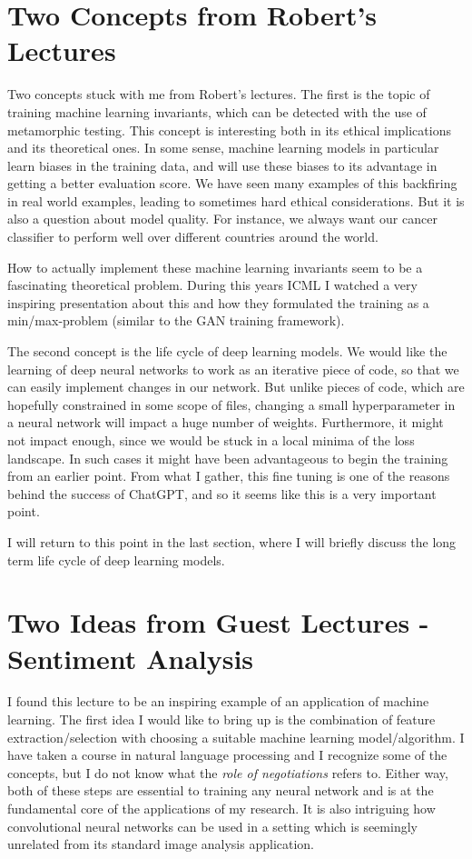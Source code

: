 \documentclass[11pt]{article}
\begin{document}
\section*{Two Concepts from Robert's Lectures}

Two concepts stuck with me from Robert's lectures. The first is the topic of training machine learning invariants, which can be detected with the use of metamorphic testing. This concept is interesting both in its ethical implications and its theoretical ones.  In some sense, machine learning models in particular learn biases in the training data, and will use these biases to its advantage in getting a better evaluation score. We have seen many examples of this backfiring in real world examples, leading to sometimes hard ethical considerations. But it is also a question about model quality. For instance, we always want our cancer classifier to perform well over different countries around the world. 

How to actually implement these machine learning invariants seem to be a fascinating theoretical problem. During this years ICML I watched a very inspiring presentation about this and how they formulated the training as a min/max-problem (similar to the GAN training framework).

The second concept is the life cycle of deep learning models. We would like the learning of deep neural networks to work as an iterative piece of code, so that we can easily implement changes in our network. But unlike pieces of code, which are hopefully constrained in some scope of files, changing a small hyperparameter in a neural network will impact a huge number of weights. Furthermore, it might not impact enough, since we would be stuck in a local minima of the loss landscape. In such cases it might have been advantageous to begin the training from an earlier point. From what I gather, this fine tuning is one of the reasons behind the success of ChatGPT, and so it seems like this is a very important point. 

I will return to this point in the last section, where I will briefly discuss the long term life cycle of deep learning models.

\section*{Two Ideas from Guest Lectures - Sentiment Analysis}
I found this lecture to be an inspiring example of an application of machine learning. The first idea I would like to bring up is the combination of feature extraction/selection with choosing a suitable machine learning model/algorithm. I have taken a course in natural language processing and I recognize some of the concepts, but I do not know what the \textit{role of negotiations} refers to. Either way, both of these steps are essential to training any neural network and is at the fundamental core of the applications of my research. It is also intriguing how convolutional neural networks can be used in a setting which is seemingly unrelated from its standard image analysis application.
\end{document}
